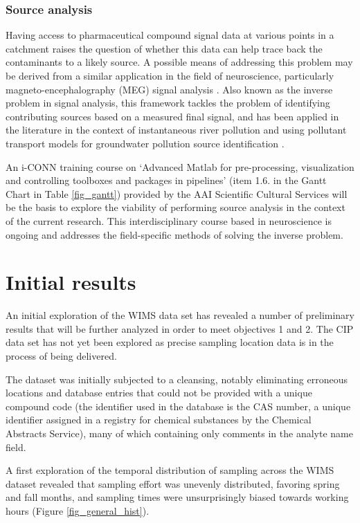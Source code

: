 \documentclass{article}
\begin{document}
\subsubsection{Source analysis}
 \label{source_analysis}
Having access to pharmaceutical compound signal data at various points in a catchment raises the question of whether this data can help trace back the contaminants to a likely source. A possible means of addressing this problem may be derived from a similar application in the field of neuroscience, particularly magneto-encephalography (MEG) signal analysis \citep{Taylor1999MathematicalExpansions}.  Also known as the inverse problem in signal analysis, this framework tackles the problem of identifying contributing sources based on a measured final signal, and has been applied in the literature in the context of instantaneous river pollution \citep{Han2014InverseAccuracy} and using pollutant transport models for groundwater pollution source identification \citep{Gurarslan2015SolvingAlgorithm,Jamshidi2020SolvingOptimization}.

An i-CONN training course on ‘Advanced Matlab for pre-processing, visualization and controlling toolboxes and packages in pipelines’ (item 1.6. in the Gantt Chart in Table \ref{fig_gantt}) provided by the AAI Scientific Cultural Services will be the basis to explore the viability of performing source analysis in the context of the current research. This interdisciplinary course based in neuroscience is ongoing and addresses the field-specific methods of solving the inverse problem. 

\clearpage
\section{Initial results}
An initial exploration of the WIMS data set has revealed a number of preliminary results that will be further analyzed in order to meet objectives 1 and 2. The CIP data set has not yet been explored as precise sampling location data is in the process of being delivered.

The dataset was initially subjected to a cleansing, notably eliminating erroneous locations and database entries that could not be provided with a unique compound code (the identifier used in the database is the CAS number, a unique identifier assigned in a registry for chemical substances by the Chemical Abstracts Service), many of which containing only comments in the analyte name field.

A first exploration of the temporal distribution of sampling across the WIMS dataset revealed that sampling effort was unevenly distributed, favoring spring and fall months, and sampling times were unsurprisingly biased towards working hours (Figure \ref{fig_general_hist}).
\end{document}
